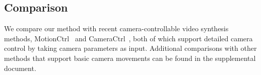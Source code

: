 \begin{table}[!t]
\centering
{}
\vspace{-3.0mm}
\caption{
Quantitative evaluation of camera controllability using the RealEstate10K test dataset~\cite{zhou2018stereo}. 
Our method shows superior camera control performance against previous methods~\cite{he2024cameractrl, wang2024motionctrl}, even without using camera parameters in training.
}
\vspace{-4.0mm}
\label{table:cam_control}
\end{table}





\subsection{Comparison}


We compare our method with recent camera-controllable video synthesis methods, MotionCtrl~\cite{wang2024motionctrl} and CameraCtrl~\cite{he2024cameractrl}, both of which support detailed camera control by taking camera parameters as input.
Additional comparisons with other methods that support basic camera movements can be found in the supplemental document.







